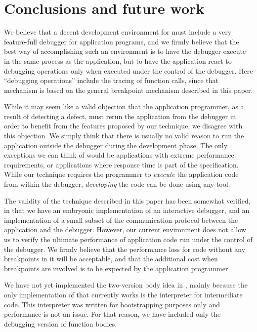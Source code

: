 \section{Conclusions and future work}

We believe that a decent development environment for \commonlisp{}
must include a very feature-full debugger for application programs, and
we firmly believe that the best way of accomplishing such an
environment is to have the debugger execute in the same process as the
application, but to have the application react to debugging operations
only when executed under the control of the debugger.  Here
``debugging operations'' include the tracing of function calls, since
that mechanism is based on the general breakpoint mechanism described
in this paper.

While it may seem like a valid objection that the application
programmer, as a result of detecting a defect, must rerun the
application from the debugger in order to benefit from the features
proposed by our technique, we disagree with this objection.  We simply
think that there is usually no valid reason to run the application
outside the debugger during the development phase.  The only
exceptions we can think of would be applications with extreme
performance requirements, or applications where response time is part
of the specification.  While our technique requires the programmer to
\emph{execute} the application code from within the debugger,
\emph{developing} the code can be done using any tool.

The validity of the technique described in this paper has been
somewhat verified, in that we have an embryonic implementation of an
interactive debugger, and an implementation of a small subset of the
communication protocol between the application and the debugger.
However, our current environment does not allow us to verify the
ultimate performance of application code run under the control of the
debugger.  We firmly believe that the performance loss for code
without any breakpoints in it will be acceptable, and that the
additional cost when breakpoints are involved is to be expected by the
application programmer.

We have not yet implemented the two-version body idea
 in \sicl{},
mainly because the only implementation of \sicl{} that currently works
is the interpreter for intermediate code.  This interpreter was
written for bootstrapping purposes only and performance is not an
issue.  For that reason, we have included only the debugging version
of function bodies.


